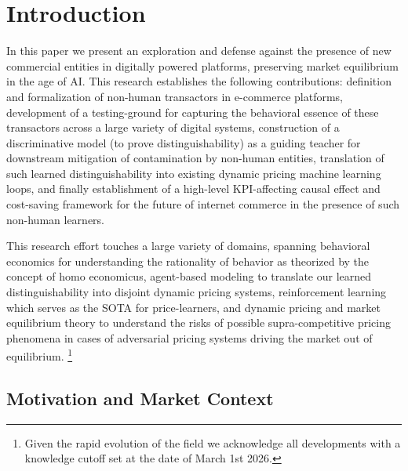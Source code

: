 
\section{Introduction}
\label{sec:introduction}

In this paper we present an exploration and defense against the presence of new commercial entities in digitally powered platforms, preserving market equilibrium in the age of AI. This research establishes the following contributions: definition and formalization of non-human transactors in e-commerce platforms, development of a testing-ground for capturing the behavioral essence of these transactors across a large variety of digital systems, construction of a discriminative model (to prove distinguishability) as a guiding teacher for downstream mitigation of contamination by non-human entities, translation of such learned distinguishability into existing dynamic pricing machine learning loops, and finally establishment of a high-level KPI-affecting causal effect and cost-saving framework for the future of internet commerce in the presence of such non-human learners.

This research effort touches a large variety of domains, spanning behavioral economics for understanding the rationality of behavior as theorized by the concept of homo economicus, agent-based modeling to translate our learned distinguishability into disjoint dynamic pricing systems, reinforcement learning which serves as the SOTA for price-learners, and dynamic pricing and market equilibrium theory to understand the risks of possible supra-competitive pricing phenomena in cases of adversarial pricing systems driving the market out of equilibrium. \footnote{Given the rapid evolution of the field we acknowledge all developments with a knowledge cutoff set at the date of March 1st 2026.}

\subsection{Motivation and Market Context}

